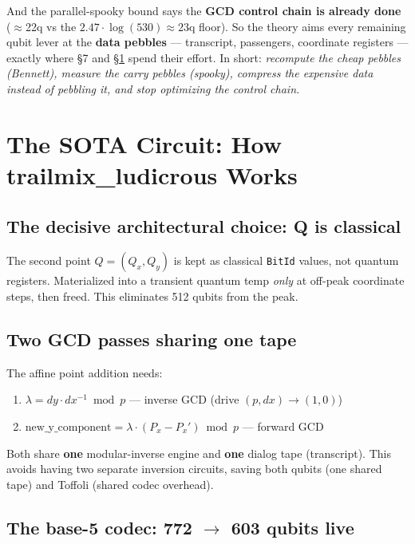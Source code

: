 \documentclass[11pt,a4paper]{article}
\begin{document}
And the parallel-spooky bound says the \textbf{GCD control chain is already done} ($\approx$22q vs
the $2.47\cdot\log(530) \approx 23$q floor). So the theory aims every remaining qubit lever at the
\textbf{data pebbles} --- transcript, passengers, coordinate registers --- exactly where \S7 and
\S\ref{sec:trailmix} spend their effort. In short: \emph{recompute the cheap pebbles (Bennett), measure
the carry pebbles (spooky), compress the expensive data instead of pebbling it, and stop optimizing
the control chain.}

\section{The SOTA Circuit: How trailmix\_ludicrous Works}
\label{sec:trailmix}

\subsection{The decisive architectural choice: Q is classical}

The second point $Q = (Q_x, Q_y)$ is kept as classical \texttt{BitId} values, not quantum
registers. Materialized into a transient quantum temp \emph{only} at off-peak coordinate steps,
then freed. This eliminates 512 qubits from the peak.

\subsection{Two GCD passes sharing one tape}

The affine point addition needs:
\begin{enumerate}
  \item $\lambda = dy \cdot dx^{-1} \bmod p$ --- inverse GCD (drive $(p, dx) \to (1, 0)$)
  \item $\text{new\_y\_component} = \lambda \cdot (P_x - P_x') \bmod p$ --- forward GCD
\end{enumerate}

Both share \textbf{one} modular-inverse engine and \textbf{one} dialog tape (transcript). This
avoids having two separate inversion circuits, saving both qubits (one shared tape) and Toffoli
(shared codec overhead).

\subsection{The base-5 codec: 772 $\to$ 603 qubits live}
\end{document}
